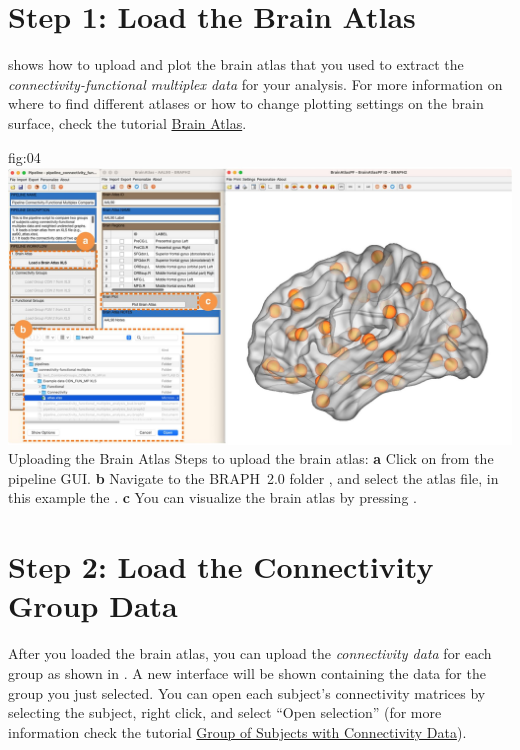\documentclass[justified]{tufte-handout}
\begin{document}
\clearpage
\section{Step 1: Load the Brain Atlas}

 shows how to upload and plot the brain atlas that you used to extract the \emph{connectivity-functional multiplex data} for your analysis. For more information on where to find different atlases or how to change plotting settings on the brain surface, check the tutorial \href{https://github.com/braph-software/BRAPH-2/tree/develop/tutorials/general/tut_ba}{Brain Atlas}.

	{fig:04}
	{
	\includegraphics{fig04.jpg}
	}
	{Uploading the Brain Atlas}
	{
	Steps to upload the brain atlas:
	{\bf a} Click on  from the pipeline GUI.
	{\bf b} Navigate to the BRAPH~2.0 folder , and select the atlas file, in this example the .  
	{\bf c} You can visualize the brain atlas by pressing . 
	}
 
\clearpage
\section{Step 2: Load the Connectivity Group Data}

After you loaded the brain atlas, you can upload the \emph{connectivity data} for each group as shown in . A new interface will be shown containing the data for the group you just selected. You can open each subject’s connectivity matrices by selecting the subject, right click, and select “Open selection” (for more information check the tutorial \href{https://github.com/braph-software/BRAPH-2/tree/develop/tutorials/general/tut_gr_con}{Group of Subjects with Connectivity Data}).
\end{document}
